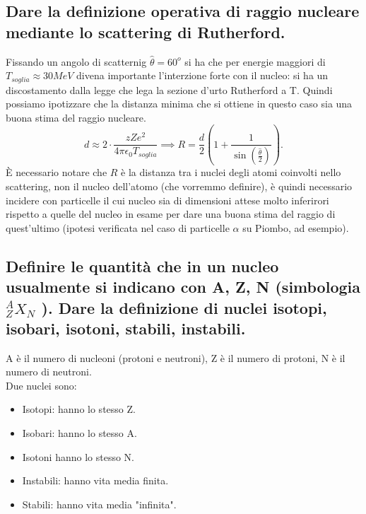 \subsection[$\ $ Definizione di raggio nucleare tramite lo Scattering Rutherford]{Dare la definizione operativa di raggio nucleare mediante lo scattering di Rutherford.}
Fissando un angolo di scatternig $\hat{\theta} = 60^o$ si ha che per energie maggiori di $T_{soglia} \approx 30 MeV$ divena importante l'interzione forte con il nucleo: si ha un discostamento dalla legge che lega la sezione d'urto Rutherford a T. Quindi possiamo ipotizzare che la distanza minima che si ottiene in questo caso sia una buona stima del raggio nucleare.
\[
	d \approx 2\cdot \frac{zZ e^2}{4 \pi \epsilon_0 T_{soglia}} \implies R = \frac{d}{2}\left( 1 + \frac{1}{\sin\left( \frac{\hat{\theta}}{2} \right) } \right) 
.\] 
È necessario notare che $R$ è la distanza tra i nuclei degli atomi coinvolti nello scattering, non il nucleo dell'atomo (che vorremmo definire), è quindi necessario incidere con particelle il cui nucleo sia di dimensioni attese molto inferirori rispetto a quelle del nucleo in esame per dare una buona stima del raggio di quest'ultimo (ipotesi verificata nel caso di particelle $\alpha$ su Piombo, ad esempio).

\subsection[$\ $ Definizione di A, Z, N, nuclei isotopi, isobari, isotoni, stabili ed instabili]{Definire le quantità che in un nucleo usualmente si indicano con A, Z, N (simbologia ${}^A_Z X_N$ ). Dare la definizione di nuclei isotopi, isobari, isotoni, stabili, instabili.}
A è il numero di nucleoni (protoni e neutroni), Z è il numero di protoni, N è il numero di neutroni.\\
Due nuclei sono:
\begin{itemize}
	\item Isotopi: hanno lo stesso Z.
	\item Isobari: hanno lo stesso A.
	\item Isotoni hanno lo stesso N.
	\item Instabili: hanno vita media finita.
	\item Stabili: hanno vita media "infinita".
\end{itemize}


